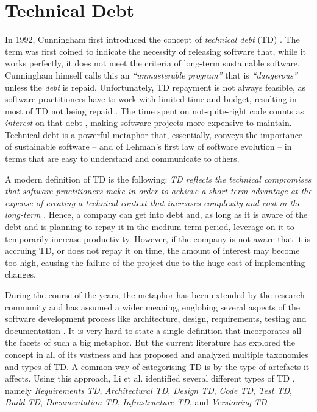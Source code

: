 \section{Technical Debt}
In 1992, Cunningham first introduced the concept of \emph{technical debt} (TD) \cite{Cunningham1992}. 
The term was first coined to indicate the necessity of releasing software that, while it works perfectly, it does not meet the criteria of long-term sustainable software. 
Cunningham himself calls this an \emph{``unmasterable program''} that is \emph{``dangerous''} unless the \emph{debt} is repaid.
Unfortunately, TD repayment is not always feasible, as software practitioners have to work with limited time and budget, resulting in most of TD not being repaid \cite{Digkas2018}.
The time spent on not-quite-right code counts as \emph{interest} on that debt \cite{Cunningham1992}, making software projects more expensive to maintain.
Technical debt is a powerful metaphor that, essentially, conveys the importance of sustainable software -- and of Lehman's first law of software evolution -- in terms that are easy to understand and communicate to others. 

A modern definition of TD is the following: \emph{TD reflects the technical compromises that software practitioners make in order to achieve a short-term advantage at the expense of creating a technical context that increases complexity and cost in the long-term} \cite{Avgeriou2016}. 
Hence, a company can get into debt and, as long as it is aware of the debt and is planning to repay it in the medium-term period, leverage on it to temporarily increase productivity.
However, if the company is not aware that it is accruing TD, or does not repay it on time, the amount of interest may become too high, causing the failure of the project due to the huge cost of implementing changes.

During the course of the years, the metaphor has been extended by the research community and has assumed a wider meaning, englobing several aspects of the software development process like architecture, design, requirements, testing and documentation \cite{Brown2010}.
It is very hard to state a single definition that incorporates all the facets of such a big metaphor. 
But the current literature has explored the concept in all of its vastness and has proposed and analyzed multiple taxonomies and types of TD.
A common way of categorising TD is by the type of artefacts it affects. Using this approach, Li et al. identified several different types of TD \cite{Li2015}, namely \emph{Requirements TD}, \emph{Architectural TD}, \emph{Design TD}, \emph{Code TD}, \emph{Test TD}, \emph{Build TD}, \emph{Documentation TD}, \emph{Infrastructure TD}, and \emph{Versioning TD}.

